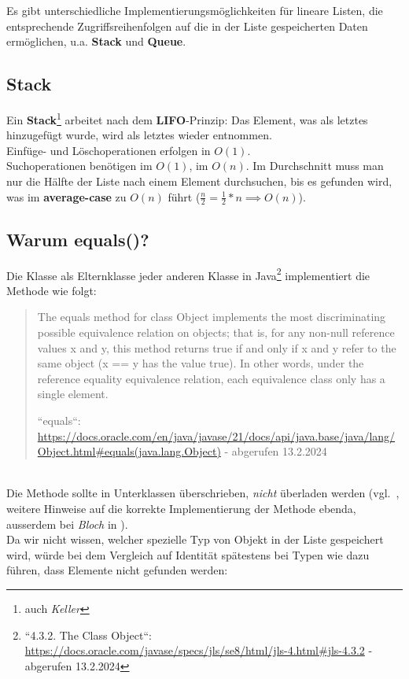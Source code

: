 \noindent
Es gibt unterschiedliche Implementierungsmöglichkeiten für lineare Listen, die entsprechende Zugriffsreihenfolgen auf die in der Liste gespeicherten Daten ermöglichen, u.a. \textbf{Stack} und \textbf{Queue}.\\

\subsection*{Stack}
Ein \textbf{Stack}\footnote{
auch \textit{Keller}
} arbeitet nach dem \textbf{LIFO}-Prinzip: Das Element, was als letztes hinzugefügt wurde, wird als letztes wieder entnommen.\\
Einfüge- und Löschoperationen erfolgen in $O(1)$.\\
Suchoperationen benötigen im  $O(1)$, im  $O(n)$.
Im Durchschnitt muss man nur die Hälfte der Liste nach einem Element durchsuchen, bis es gefunden wird, was im \textbf{average-case} zu $O(n)$ führt ($\frac{n}{2} = \frac{1}{2} * n \implies O(n)$).


\subsection*{Warum equals()?}
Die Klasse  als Elternklasse jeder anderen Klasse in Java\footnote{
    ``4.3.2. The Class Object``: \url{https://docs.oracle.com/javase/specs/jls/se8/html/jls-4.html#jls-4.3.2} - abgerufen 13.2.2024
} implementiert die Methode  wie folgt:
\blockquote[{``equals``:  \url{https://docs.oracle.com/en/java/javase/21/docs/api/java.base/java/lang/Object.html#equals(java.lang.Object)} - abgerufen 13.2.2024}]{
    The equals method for class Object implements the most discriminating possible equivalence relation on objects; that is, for any non-null reference values x and y, this method returns true if and only if x and y refer to the same object (x == y has the value true). In other words, under the reference equality equivalence relation, each equivalence class only has a single element.
}. \\

Die Methode  sollte in Unterklassen überschrieben, \textit{nicht} überladen werden (vgl.~\cite[654]{Ull23}, weitere Hinweise auf die korrekte Implementierung der Methode ebenda, ausserdem bei \textit{Bloch} in \cite[37]{Blo18}).\\

\noindent
Da wir nicht wissen, welcher spezielle Typ von Objekt in der Liste gespeichert wird, würde bei dem Vergleich auf Identität spätestens bei Typen wie  dazu führen, dass Elemente nicht gefunden werden:

